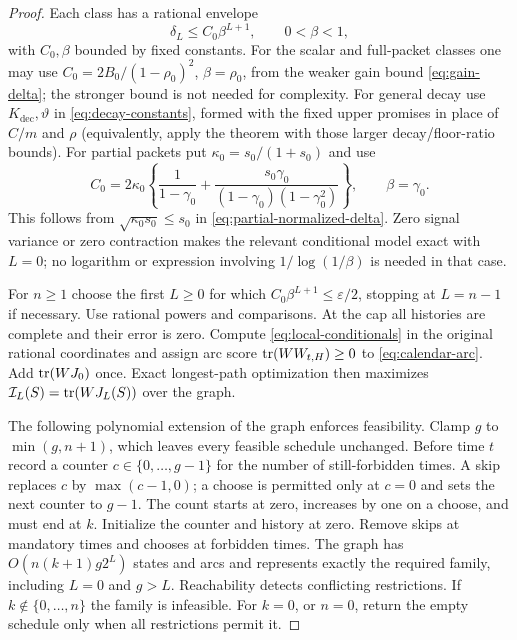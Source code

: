 \begin{proof}
Each class has a rational envelope
\begin{equation}
 \delta_L\le C_0\beta^{L+1},\qquad 0<\beta<1,
 \label{eq:complexity-envelope}
\end{equation}
with $C_0,\beta$ bounded by fixed constants. For the scalar and full-packet
classes one may use $C_0=2B_0/(1-\rho_0)^2$, $\beta=\rho_0$, from the
weaker gain bound \eqref{eq:gain-delta}; the stronger bound is not needed
for complexity. For general decay use $K_{\mathrm{dec}},\vartheta$ in
\eqref{eq:decay-constants}, formed with the fixed upper promises in place of
$C/m$ and $\rho$ (equivalently, apply the theorem with those larger
decay/floor-ratio bounds). For partial packets put
$\kappa_0=s_0/(1+s_0)$ and use
\[
 C_0=2\kappa_0\left\{\frac1{1-\gamma_0}
       +\frac{s_0\gamma_0}{(1-\gamma_0)(1-\gamma_0^2)}\right\},
 \qquad\beta=\gamma_0.
\]
This follows from $\sqrt{\kappa_0s_0}\le s_0$ in
\eqref{eq:partial-normalized-delta}. Zero signal variance or zero contraction
makes the relevant conditional model exact with $L=0$; no logarithm or
expression involving $1/\log(1/\beta)$ is needed in that case.

For $n\ge1$ choose the first $L\ge0$ for which
$C_0\beta^{L+1}\le\varepsilon/2$, stopping at $L=n-1$ if necessary.
Use rational powers and comparisons. At the cap all histories are complete
and their error is zero. Compute \eqref{eq:local-conditionals} in the
original rational coordinates and assign arc score
$\operatorname{tr}(W W_{t,H})\ge0$ to \eqref{eq:calendar-arc}. Add
$\operatorname{tr}(WJ_0)$ once. Exact longest-path optimization then maximizes
$\mathcal I_L(S)=\operatorname{tr}(WJ_L(S))$ over the graph.

The following polynomial extension of the graph enforces feasibility.
Clamp $g$ to $\min(g,n+1)$, which leaves every feasible schedule unchanged.
Before time $t$ record a counter $c\in\{0,\ldots,g-1\}$ for the number of
still-forbidden times. A skip replaces $c$ by $\max(c-1,0)$; a choose is
permitted only at $c=0$ and sets the next counter to $g-1$. The count starts
at zero, increases by one on a choose, and must end at $k$. Initialize the
counter and history at zero. Remove skips at mandatory times and chooses
at forbidden times. The graph has
$O(n(k+1)g2^L)$ states and arcs and represents exactly the required family,
including $L=0$ and $g>L$. Reachability detects conflicting restrictions.
If $k\notin\{0,\ldots,n\}$ the family is infeasible. For $k=0$, or $n=0$,
return the empty schedule only when all restrictions permit it.


\end{proof}
